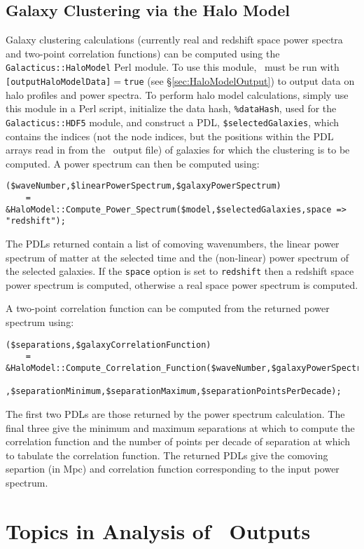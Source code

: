 \subsection{Galaxy Clustering via the Halo Model}\label{sec:ClusteringHaloModel}

Galaxy clustering calculations (currently real and redshift space power spectra and two-point correlation functions) can be computed using the {\tt Galacticus::HaloModel} Perl module. To use this module, \glc\ must be run with {\tt [outputHaloModelData]}$=${\tt true} (see \S\ref{sec:HaloModelOutput}) to output data on halo profiles and power spectra. To perform halo model calculations, simply use this module in a Perl script, initialize the data hash, {\tt \%dataHash}, used for the {\tt Galacticus::HDF5} module, and construct a PDL, {\tt \$selectedGalaxies}, which contains the indices (not the node indices, but the positions within the PDL arrays read in from the \glc\ output file) of galaxies for which the clustering is to be computed. A power spectrum can then be computed using:
\begin{verbatim}
($waveNumber,$linearPowerSpectrum,$galaxyPowerSpectrum) 
    = &HaloModel::Compute_Power_Spectrum($model,$selectedGalaxies,space => "redshift");
\end{verbatim}
The PDLs returned contain a list of comoving wavenumbers, the linear power spectrum of matter at the selected time and the (non-linear) power spectrum of the selected galaxies. If the {\tt space} option is set to {\tt redshift} then a redshift space power spectrum is computed, otherwise a real space power spectrum is computed.

A two-point correlation function can be computed from the returned power spectrum using:
\begin{verbatim}
($separations,$galaxyCorrelationFunction) 
    = &HaloModel::Compute_Correlation_Function($waveNumber,$galaxyPowerSpectrum
        ,$separationMinimum,$separationMaximum,$separationPointsPerDecade);
\end{verbatim}
The first two PDLs are those returned by the power spectrum calculation. The final three give the minimum and maximum separations at which to compute the correlation function and the number of points per decade of separation at which to tabulate the correlation function. The returned PDLs give the comoving separtion (in Mpc) and correlation function corresponding to the input power spectrum.

\section{Topics in Analysis of \glc\ Outputs}

